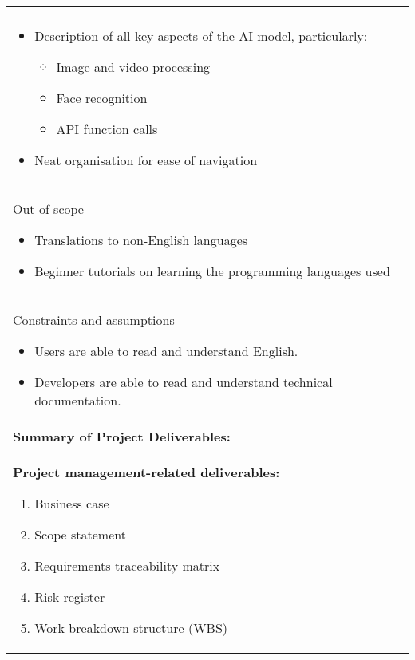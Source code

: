 \begin{longtable}{ | p{} l | }
{    } \\
    \multicolumn{2}{|p{\textwidth}|}{\hspace{0.6cm}
        \begin{itemize}
            \item Description of all key aspects of the AI model, particularly:
                \begin{itemize}
                    \item Image and video processing
                    \item Face recognition
                    \item API function calls
                \end{itemize}
            \item Neat organisation for ease of navigation
        \end{itemize}
    } \\
    \multicolumn{2}{|p{\textwidth}|}{\hspace{0.6cm}\underline{Out of scope}
        \begin{itemize}
            \item Translations to non-English languages
            \item Beginner tutorials on learning the programming languages used
        \end{itemize}
    } \\
    \multicolumn{2}{|p{\textwidth}|}{\hspace{0.6cm}\underline{Constraints and assumptions}
        \begin{itemize}
            \item Users are able to read and understand English.
            \item Developers are able to read and understand technical documentation.
        \end{itemize}
    } \\
    \hline
    \multicolumn{2}{|l|}{\textbf{Summary of Project Deliverables:}} \\
    \multicolumn{2}{|p{\textwidth}|}{\textbf{Project management-related deliverables:}
        \begin{enumerate}
            \item Business case
            \item Scope statement
            \item Requirements traceability matrix
            \item Risk register
            \item Work breakdown structure (WBS)

\end{enumerate}}
\end{longtable}
